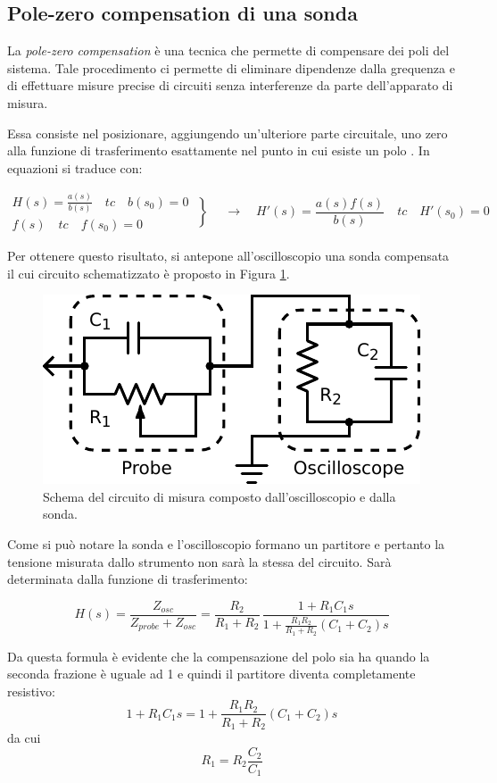 \subsection{Pole-zero compensation di una sonda}

La \textit{pole-zero compensation} è una tecnica che permette di compensare dei poli del sistema. Tale procedimento ci permette di eliminare dipendenze dalla grequenza e di effettuare misure precise di circuiti senza interferenze da parte dell'apparato di misura.

Essa consiste nel posizionare, aggiungendo un'ulteriore parte circuitale, uno zero alla funzione di trasferimento esattamente nel punto in cui esiste un polo .
In equazioni si traduce con:

\[
  \begin{array}{lr}
H(s) = \frac{a(s)}{b(s)} \quad tc \quad b(s_0) = 0 \\
f(s) \quad tc \quad f(s_0) = 0
  \end{array}\left\}
\quad \longrightarrow \quad H'(s) = \frac{a(s)f(s)}{b(s)} \quad tc \quad H'(s_0) = 0
\right.
\]

Per ottenere questo risultato, si antepone all'oscilloscopio una sonda compensata il cui circuito schematizzato è proposto in Figura \ref{cir8:probe}.

\begin{figure}
\centering
\includegraphics[width=.35\textwidth]{../E08/latex/probe.pdf}
\caption{Schema del circuito di misura composto dall'oscilloscopio e dalla sonda.}
\label{cir8:probe}
\end{figure}
Come si può notare la sonda e l'oscilloscopio formano un partitore e pertanto la tensione misurata dallo strumento non sarà la stessa del circuito.
Sarà determinata dalla funzione di trasferimento:

\begin{equation}
H(s)=\frac{Z_{osc}}{Z_{probe}+Z_{osc}} = \frac{R_2}{R_1+R_2}\,\frac{1+R_1C_1s}{1+\frac{R_1R_2}{R_1+R_2}(C_1+C_2)s}
\end{equation}

Da questa formula è evidente che la compensazione del polo sia ha quando la seconda frazione è uguale ad \num{1} e quindi il partitore diventa completamente resistivo:
\begin{equation*}
1+R_1C_1s = 1+\frac{R_1R_2}{R_1+R_2}(C_1+C_2)s
\end{equation*}
da cui
\begin{equation}
R_1 = R_2 \frac{C_2}{C_1}
\end{equation}

